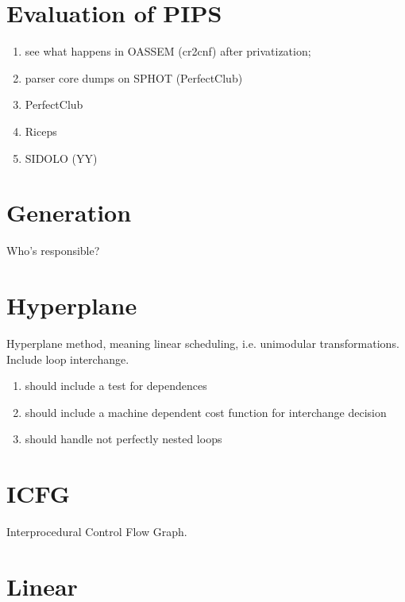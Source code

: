 \section{Evaluation of PIPS}

\begin{enumerate}

  \item see what happens in OASSEM (cr2cnf) after privatization;

  \item parser core dumps on SPHOT (PerfectClub)

  \item PerfectClub

  \item Riceps

  \item SIDOLO (YY)

\end{enumerate}

\section{Generation}

Who's responsible?

\section{Hyperplane}

Hyperplane method, meaning linear scheduling, i.e. unimodular transformations.
Include loop interchange.

\begin{enumerate}

  \item {} should include a test for dependences

  \item {} should include a machine dependent cost 
function for interchange decision

  \item should handle not perfectly nested loops
\end{enumerate}

\section{ICFG}

Interprocedural Control Flow Graph.

\section{Linear}

